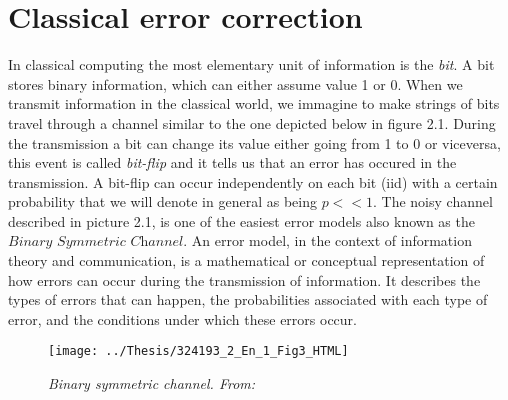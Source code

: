 \documentclass{Configuration_Files/PoliMi3i_thesis}
\begin{document}
\section{Classical error correction}
\label{sec:CER}

In classical computing the most elementary unit of information is the {\it bit}. A bit stores binary information, which can either assume value 1 or 0. When we transmit information in the classical world, we immagine to make strings of bits travel through a channel similar to the one depicted below in figure 2.1. \newline
During the transmission a bit can change its value either going from 1 to 0 or viceversa, this event is called {\it bit-flip} and it tells us that an error has occured in the transmission. A bit-flip can occur independently on each bit (iid) with a certain probability that we will denote in general as being $p <<1$.\newline
The noisy channel described in picture 2.1, is one of the easiest error models also known as the $\textit{Binary Symmetric Channel}$. An error model, in the context of information theory and communication, is a mathematical or conceptual representation of how errors can occur during the transmission of information. It describes the types of errors that can happen, the probabilities associated with each type of error, and the conditions under which these errors occur. \newline

\begin{figure}
	\centering
	\texttt{[image: ../Thesis/324193\_2\_En\_1\_Fig3\_HTML]}
	\caption{{\it Binary symmetric channel. From: \cite{Cha06}}}
	\label{fig:3241932en1fig3html}
\end{figure}
\end{document}

